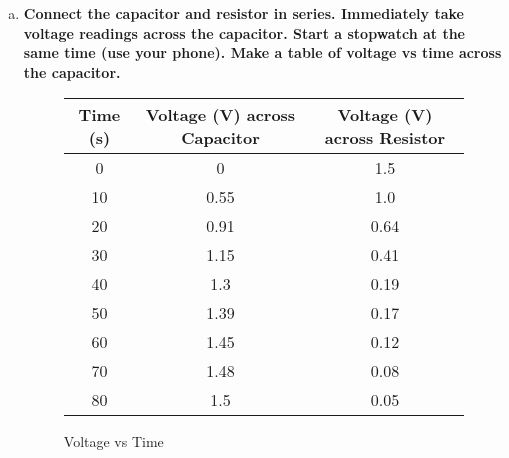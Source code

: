 \documentclass[article, 12pt]{article}
\begin{document}
\begin{enumerate}[a)]
        Each D-cell battery has a voltage of \SI{1.5}{\volt}. We did this lab using just one D-cell battery.
        \item \textbf{Connect the capacitor and resistor in series. Immediately take voltage readings across the capacitor. Start a stopwatch at the same time (use your phone).  Make a table of voltage vs time across the capacitor.} 
        \begin{figure}[H]
            \centering
            \begin{tabular}{|c|c|c|}
                \hline
                Time (s) & Voltage (V) across Capacitor & Voltage (V) across Resistor \\
                \hline
                0 & 0 & 1.5 \\
                10 & 0.55 & 1.0 \\
                20 & 0.91 & 0.64 \\
                30 & 1.15 & 0.41 \\
                40 & 1.3 & 0.19 \\
                50 & 1.39 & 0.17 \\
                60 & 1.45 & 0.12 \\
                70 & 1.48 & 0.08 \\
                80 & 1.5 & 0.05 \\
                \hline
            \end{tabular}
            \caption{Voltage vs Time}
            \label{fig:voltageTable}
        \end{figure}
        \begin{figure}[H]
            \centering
\end{figure}
\end{enumerate}
\end{document}

